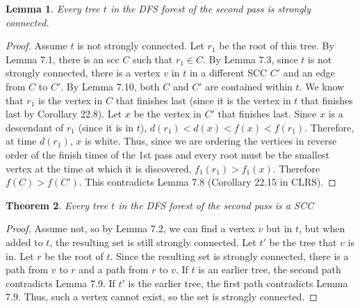 \documentclass{article}
\newtheorem{theorem}{Theorem}[section]
\newtheorem{lemma}[theorem]{Lemma}
\begin{document}
\begin{lemma}
Every tree $t$ in the DFS forest of the second pass is strongly connected.
\end{lemma}
\begin{proof}
Assume $t$ is not strongly connected. Let $r_1$ be the root of this tree. By Lemma 7.1, there is an scc $C$ such that $r_1\in C$. By Lemma 7.3, since $t$ is not strongly connected, there is a vertex $v$ in $t$ in a different SCC $C'$ and an edge from $C$ to $C'$. By Lemma 7.10, both $C$ and $C'$ are contained within $t$. We know that $r_1$ is the vertex in $C$ that finishes last (since it is the vertex in $t$ that finishes last by Corollary 22.8). Let $x$ be the vertex in $C'$ that finishes last. Since $x$ is a descendant of $r_1$ (since it is in $t$), $d(r_1) < d(x) < f(x) < f(r_1)$. Therefore, at time $d(r_1)$, $x$ is white. Thus, since we are ordering the vertices in reverse order of the finish times of the 1st pass and every root must be the smallest vertex at the time at which it is discovered, $f_1(r_1) > f_1(x)$.
Therefore $f(C) > f(C')$. This contradicts Lemma 7.8 (Corollary 22.15 in CLRS).  
\end{proof}
\begin{theorem}
Every tree $t$ in the DFS forest of the second pass is a SCC
\end{theorem}
\begin{proof}
Assume not, so by Lemma 7.2, we can find a vertex $v$ but in $t$, but when added to $t$, the resulting set is still strongly connected. Let $t'$ be the tree that $v$ is in. Let $r$ be the root of $t$. Since the resulting set is strongly connected, there is a path from $v$ to $r$ and a path from $r$ to $v$. If $t$ is an earlier tree, the second path contradicts Lemma 7.9. If $t'$ is the earlier tree, the first path contradicts Lemma 7.9. Thus, such a vertex cannot exist, so the set is strongly connected.
\end{proof}
\end{document}
